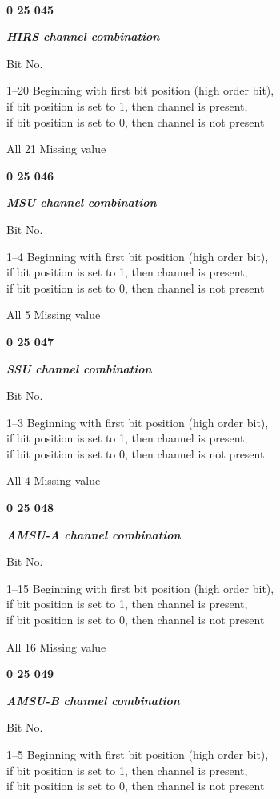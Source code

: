 \textbf{\\
}

\textbf{0 25 045}

\emph{\textbf{HIRS channel combination}}

Bit No.

1--20 Beginning with first bit position (high order bit),\\
if bit position is set to 1, then channel is present,\\
if bit position is set to 0, then channel is not present

All 21 Missing value

\textbf{0 25 046}

\emph{\textbf{MSU channel combination}}

Bit No.

1--4 Beginning with first bit position (high order bit),\\
if bit position is set to 1, then channel is present,\\
if bit position is set to 0, then channel is not present

All 5 Missing value

\textbf{0 25 047}

\emph{\textbf{SSU channel combination}}

Bit No.

1--3 Beginning with first bit position (high order bit),\\
if bit position is set to 1, then channel is present;\\
if bit position is set to 0, then channel is not present

All 4 Missing value

\textbf{0 25 048}

\emph{\textbf{AMSU-A channel combination}}

Bit No.

1--15 Beginning with first bit position (high order bit),\\
if bit position is set to 1, then channel is present,\\
if bit position is set to 0, then channel is not present

All 16 Missing value

\textbf{0 25 049}

\emph{\textbf{AMSU-B channel combination}}

Bit No.

1--5 Beginning with first bit position (high order bit),\\
if bit position is set to 1, then channel is present,\\
if bit position is set to 0, then channel is not present

